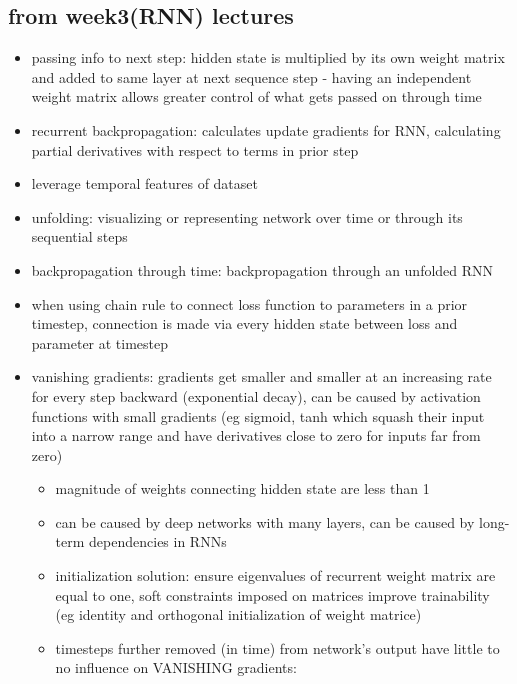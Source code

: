 \documentclass[10pt]{article}
\begin{document}
\subsection*{from week3(RNN) lectures}
\begin{itemize}[label=\(\star\), leftmargin=1em, itemsep=-0.3em]
    \item passing info to next step: hidden state is multiplied by its own weight matrix and added to same layer at next sequence step - having an independent weight matrix allows greater control of what gets passed on through time
    \item recurrent backpropagation: calculates update gradients for RNN, calculating partial derivatives with respect to terms in prior step
    \item leverage temporal features of dataset
    \item unfolding: visualizing or representing network over time or through its sequential steps
    \item backpropagation through time: backpropagation through an unfolded RNN
    \item when using chain rule to connect loss function to parameters in a prior timestep, connection is made via every hidden state between loss and parameter at timestep
    \item vanishing gradients: gradients get smaller and smaller at an increasing rate for every step backward (exponential decay), can be caused by activation functions with small gradients (eg sigmoid, tanh which squash their input into a narrow range and have derivatives close to zero for inputs far from zero)
          \begin{itemize}[label=\(\star\), leftmargin=1em, itemsep=-0.3em]
              \item magnitude of weights connecting hidden state are less than 1
              \item can be caused by deep networks with many layers, can be caused by long-term dependencies in RNNs
              \item initialization solution: ensure eigenvalues of recurrent weight matrix are equal to one, soft constraints imposed on matrices improve trainability (eg identity and orthogonal initialization of weight matrice)
              \item timesteps further removed (in time) from network's output have little to no influence on VANISHING gradients:
                    \begin{itemize}[label=\(\star\), leftmargin=1em, itemsep=-0.3em]

\end{itemize}
\end{itemize}
\end{itemize}
\end{document}
